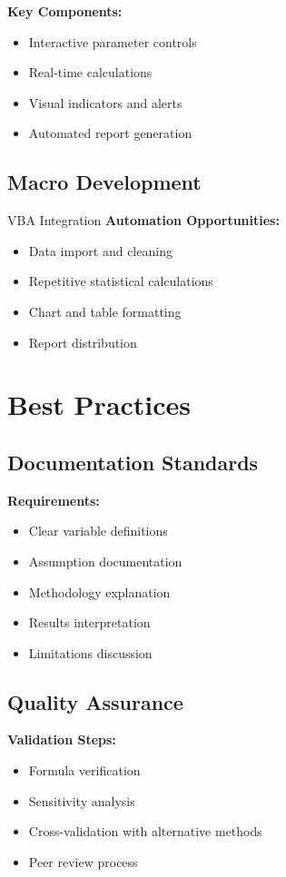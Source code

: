 \documentclass[12pt,a4paper]{book}
\begin{document}
{{\textbf{Key Components:}
\begin{itemize}
    \item Interactive parameter controls
    \item Real-time calculations
    \item Visual indicators and alerts
    \item Automated report generation
\end{itemize}

\subsection{Macro Development}

\begin{example}{VBA Integration}
\textbf{Automation Opportunities:}
\begin{itemize}
    \item Data import and cleaning
    \item Repetitive statistical calculations
    \item Chart and table formatting
    \item Report distribution
\end{itemize}
\end{example}

\section{Best Practices}

\subsection{Documentation Standards}

\textbf{Requirements:}
\begin{itemize}
    \item Clear variable definitions
    \item Assumption documentation
    \item Methodology explanation
    \item Results interpretation
    \item Limitations discussion
\end{itemize}

\subsection{Quality Assurance}

\textbf{Validation Steps:}
\begin{itemize}
    \item Formula verification
    \item Sensitivity analysis
    \item Cross-validation with alternative methods
    \item Peer review process
\end{itemize}

}}
\end{document}

